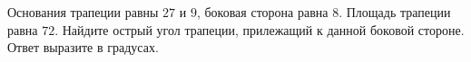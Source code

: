 \begin{ex}
	\begin{condition}
		Основания трапеции равны \( 27  \) и \( 9 \), боковая сторона равна \( 8 \). Площадь трапеции равна \( 72 \). Найдите острый угол трапеции, прилежащий к данной боковой стороне. Ответ выразите в градусах.
	\end{condition}
\end{ex}